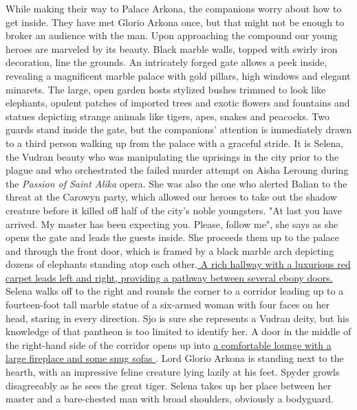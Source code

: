 While making their way to Palace Arkona, the companions worry about how to get inside. They have met Glorio Arkona once, but that might not be enough to broker an audience with the man. Upon approaching the compound our young heroes are marveled by its beauty. Black marble walls, topped with swirly iron decoration, line the grounds. An intricately forged gate allows a peek inside, revealing a magnificent marble palace with gold pillars, high windows and elegant minarets. The large, open garden hosts stylized bushes trimmed to look like elephants, opulent patches of imported trees and exotic flowers and fountains and statues depicting strange animals like tigers, apes, snakes and peacocks. Two guards stand inside the gate, but the companions' attention is immediately drawn to a third person walking up from the palace with a graceful stride. It is Selena, the Vudran beauty who was manipulating the uprisings in the city prior to the plague and who orchestrated the failed murder attempt on Aisha Leroung during the {\itshape Passion of Saint Alika} opera. She was also the one who alerted Balian to the threat at the Carowyn party, which allowed our heroes to take out the shadow creature before it killed off half of the city's noble youngsters. "At last you have arrived. My master has been expecting you. Please, follow me", she says as she opens the gate and leads the guests inside. She proceeds them up to the palace and through the front door, which is framed by a black marble arch depicting dozens of elephants standing atop each other.\hyperref[fig:Arkona-palace-in-Old-Korvosa-563928457]{ A rich hallway with a luxurious red carpet leads left and right, providing a pathway between several ebony doors. } Selena walks off to the right and rounds the corner to a corridor leading up to a fourteen-foot tall marble statue of a six-armed woman with four faces on her head, staring in every direction. Sjo is sure she represents a Vudran deity, but his knowledge of that pantheon is too limited to identify her. A door in the middle of the right-hand side of the corridor opens up into \hyperref[fig:Meeting-Glorio-Arkona-563929464]{ a comfortable lounge with a large fireplace and some snug sofas } . Lord Glorio Arkona is standing next to the hearth, with an impressive feline creature lying lazily at his feet. Spyder growls disagreeably as he sees the great tiger. Selena takes up her place between her master and a bare-chested man with broad shoulders, obviously a bodyguard. \\

